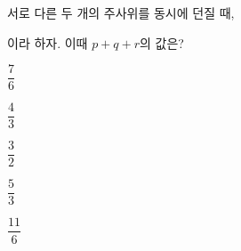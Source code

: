 서로 다른 두 개의 주사위를 동시에 던질 때,\par\smallskip{}\par{}\par{}\par\smallskip\noindent 이라 하자. 이때 $p+q+r$의 값은?
\begin{choicesii}{\rule[-3ex]{0pt}{8ex}$\dfrac{7}{6}$}{\rule[-3ex]{0pt}{8ex}$\dfrac{4}{3}$}{\rule[-3ex]{0pt}{8ex}$\dfrac{3}{2}$}{\rule[-3ex]{0pt}{8ex}$\dfrac{5}{3}$}{\rule[-3ex]{0pt}{8ex}$\dfrac{11}{6}$}\end{choicesii}
